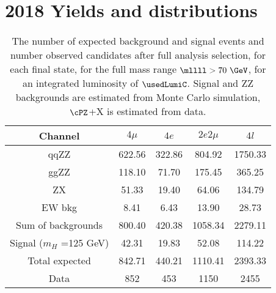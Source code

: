 \section{2018 Yields and distributions}

\begin{table}[htb]
	\begin{center}
		\small
		\caption{The number of expected background and signal events 
			and number observed candidates after full analysis selection, for each final state, 
			for the full mass range $\mllll>70~\GeV$, for an integrated luminosity of $\usedLumiC$.
			Signal and ZZ backgrounds are estimated from Monte Carlo simulation,
			$\cPZ$+X is estimated from data.
			\label{tab:EventYieldsC}}
		
\begin{tabular}{|c|c|c|c|c|}
	\hline
	\hline
	\textbf{Channel} & $4\mu$ & $4 e$ & $2e2\mu$ & $4l$ \\
	\hline
	qqZZ     &622.56         &322.86         &804.92         &1750.33        \\
	ggZZ     &118.10         &71.70  &175.45         &365.25         \\
	ZX       &51.33  &19.40  &64.06  &134.79         \\
	EW bkg   &8.41   &6.43   &13.90  &28.73  \\
	\hline
	Sum of backgrounds       &800.40         &420.38         &1058.34        &2279.11        \\
	\hline
	Signal ($m_{H}$ =125 GeV)        &42.31  &19.83  &52.08  &114.22         \\
	\hline
	Total expected   &842.71        &440.21 &1110.41        &2393.33         \\
	\hline
	Data     &852    &453    &1150   &2455   \\
	\hline
	\hline
\end{tabular}

\end{center}
\end{table}


